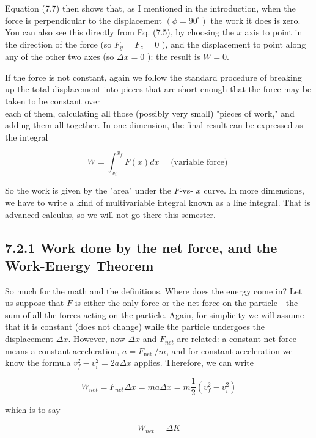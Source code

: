 \documentclass[10pt]{article}
\begin{document}
Equation (7.7) then shows that, as I mentioned in the introduction, when the force is perpendicular to the displacement $\left(\phi=90^{\circ}\right)$ the work it does is zero. You can also see this directly from Eq. (7.5), by choosing the $x$ axis to point in the direction of the force (so $F_{y}=F_{z}=0$ ), and the displacement to point along any of the other two axes (so $\Delta x=0$ ): the result is $W=0$.

If the force is not constant, again we follow the standard procedure of breaking up the total displacement into pieces that are short enough that the force may be taken to be constant over\\
each of them, calculating all those (possibly very small) "pieces of work," and adding them all together. In one dimension, the final result can be expressed as the integral


\begin{equation*}
W=\int_{x_{i}}^{x_{f}} F(x) d x \quad \text { (variable force) } \tag{7.9}
\end{equation*}


So the work is given by the "area" under the $F$-vs- $x$ curve. In more dimensions, we have to write a kind of multivariable integral known as a line integral. That is advanced calculus, so we will not go there this semester.

\subsection*{7.2.1 Work done by the net force, and the Work-Energy Theorem}
So much for the math and the definitions. Where does the energy come in? Let us suppose that $F$ is either the only force or the net force on the particle - the sum of all the forces acting on the particle. Again, for simplicity we will assume that it is constant (does not change) while the particle undergoes the displacement $\Delta x$. However, now $\Delta x$ and $F_{n e t}$ are related: a constant net force means a constant acceleration, $a=F_{\text {net }} / m$, and for constant acceleration we know the formula $v_{f}^{2}-v_{i}^{2}=2 a \Delta x$ applies. Therefore, we can write


\begin{equation*}
W_{n e t}=F_{n e t} \Delta x=m a \Delta x=m \frac{1}{2}\left(v_{f}^{2}-v_{i}^{2}\right) \tag{7.10}
\end{equation*}


which is to say


\begin{equation*}
W_{n e t}=\Delta K \tag{7.11}
\end{equation*}
\end{document}
